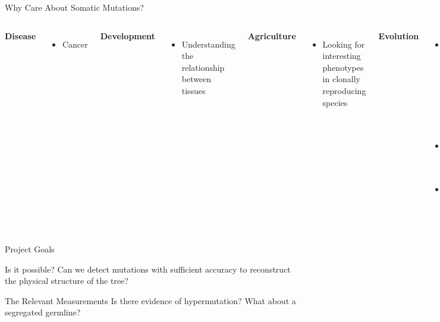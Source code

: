 \documentclass{beamer}
\begin{document}
\begin{frame}{Why Care About Somatic Mutations?}
\begin{columns}

\textbf{Disease}
\begin{itemize}
\item Cancer
\end{itemize}

\vfill

\textbf{Development}
\begin{itemize}
\item Understanding the relationship between tissues
\end{itemize}

\vfill

\textbf{Agriculture}
\begin{itemize}
\item Looking for interesting phenotypes in clonally reproducing species
\end{itemize}


\textbf{Evolution}
\begin{itemize}
\item Determining the relationship between somatic and germline mutation rate
\item Evolution of mutator phenotypes
\item Mutational stress response
\end{itemize}

\end{columns}
\end{frame}

\begin{frame}{Project Goals}

\begin{block}{Is it possible?}
Can we detect mutations with sufficient accuracy to reconstruct the physical structure of the tree?
\end{block}

\begin{exampleblock}{The Relevant Measurements}
Is there evidence of hypermutation? What about a segregated germline?
\end{exampleblock}

\end{frame}
\end{document}
